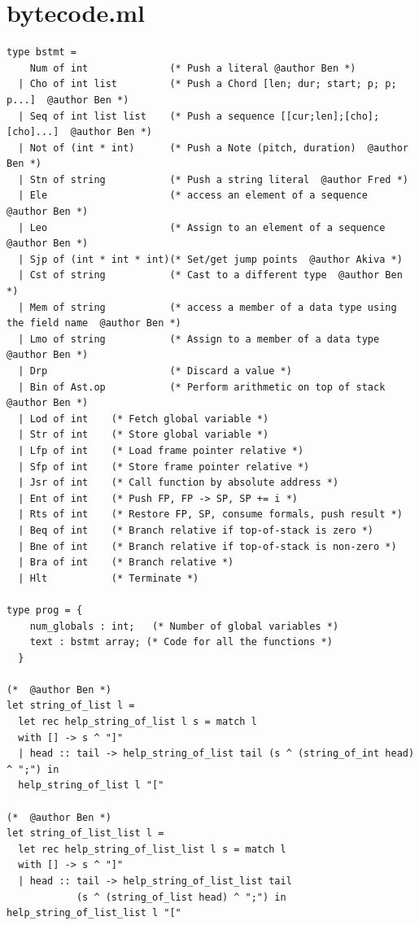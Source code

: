 \documentclass[12pt,A4]{book}
\begin{document}
\section{bytecode.ml}
\begin{verbatim}
type bstmt =
    Num of int              (* Push a literal @author Ben *)
  | Cho of int list         (* Push a Chord [len; dur; start; p; p; p...]  @author Ben *)
  | Seq of int list list    (* Push a sequence [[cur;len];[cho];[cho]...]  @author Ben *)
  | Not of (int * int)      (* Push a Note (pitch, duration)  @author Ben *)
  | Stn of string           (* Push a string literal  @author Fred *)
  | Ele                     (* access an element of a sequence  @author Ben *)
  | Leo                     (* Assign to an element of a sequence  @author Ben *)
  | Sjp of (int * int * int)(* Set/get jump points  @author Akiva *)
  | Cst of string           (* Cast to a different type  @author Ben *)
  | Mem of string           (* access a member of a data type using the field name  @author Ben *)
  | Lmo of string           (* Assign to a member of a data type  @author Ben *)
  | Drp                     (* Discard a value *)
  | Bin of Ast.op           (* Perform arithmetic on top of stack  @author Ben *)
  | Lod of int    (* Fetch global variable *)
  | Str of int    (* Store global variable *)
  | Lfp of int    (* Load frame pointer relative *)
  | Sfp of int    (* Store frame pointer relative *)
  | Jsr of int    (* Call function by absolute address *)
  | Ent of int    (* Push FP, FP -> SP, SP += i *)
  | Rts of int    (* Restore FP, SP, consume formals, push result *)
  | Beq of int    (* Branch relative if top-of-stack is zero *)
  | Bne of int    (* Branch relative if top-of-stack is non-zero *)
  | Bra of int    (* Branch relative *)
  | Hlt           (* Terminate *)

type prog = {
    num_globals : int;   (* Number of global variables *)
    text : bstmt array; (* Code for all the functions *)
  }
  
(*  @author Ben *)
let string_of_list l = 
  let rec help_string_of_list l s = match l
  with [] -> s ^ "]"
  | head :: tail -> help_string_of_list tail (s ^ (string_of_int head) ^ ";") in
  help_string_of_list l "["
    
(*  @author Ben *)
let string_of_list_list l =
  let rec help_string_of_list_list l s = match l
  with [] -> s ^ "]"
  | head :: tail -> help_string_of_list_list tail 
            (s ^ (string_of_list head) ^ ";") in help_string_of_list_list l "["
    

\end{verbatim}
\end{document}
